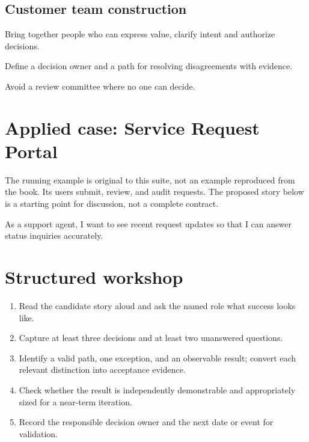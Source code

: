 \documentclass[11pt,letterpaper]{article}
\begin{document}
\subsection{Customer team construction}
Bring together people who can express value, clarify intent and authorize decisions.

\begin{tcolorbox}[colback=tealback,colframe=navy,title={Engineering translation},breakable]
Define a decision owner and a path for resolving disagreements with evidence.

\end{tcolorbox}
\begin{tcolorbox}[colback=amberback,colframe=navy,title={Failure mode to watch},breakable]
Avoid a review committee where no one can decide.

\end{tcolorbox}
\section{Applied case: Service Request Portal}
The running example is original to this suite, not an example reproduced from the book. Its users submit, review, and audit requests. The proposed story below is a starting point for discussion, not a complete contract.

\begin{tcolorbox}[colback=blueback,colframe=navy,title={Candidate story},breakable]
As a support agent, I want to see recent request updates so that I can answer status inquiries accurately.

\end{tcolorbox}
\section{Structured workshop}
\begin{enumerate}[leftmargin=*,itemsep=3pt]
\item Read the candidate story aloud and ask the named role what success looks like.
\item Capture at least three decisions and at least two unanswered questions.
\item Identify a valid path, one exception, and an observable result; convert each relevant distinction into acceptance evidence.
\item Check whether the result is independently demonstrable and appropriately sized for a near-term iteration.
\item Record the responsible decision owner and the next date or event for validation.
\end{enumerate}
\end{document}
